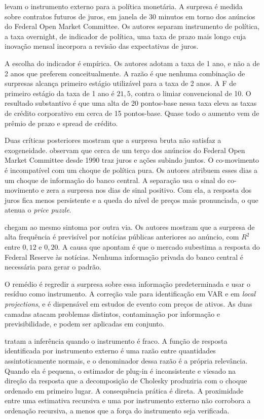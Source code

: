 \documentclass[
article,			%
12pt,				%
oneside,			%
a4paper,			%
hidelinks, 
english,			%
brazil,				%
]{abntex2}
\theoremstyle{plain}
\theoremstyle{definition}
\theoremstyle{remark}
\begin{document}
 levam o instrumento externo para a política monetária. A surpresa é medida sobre contratos futuros de juros, em janela de 30 minutos em torno dos anúncios do Federal Open Market Committee. Os autores separam instrumento de política, a taxa overnight, de indicador de política, uma taxa de prazo mais longo cuja inovação mensal incorpora a revisão das expectativas de juros.

A escolha do indicador é empírica. Os autores adotam a taxa de 1 ano, e não a de 2 anos que preferem conceitualmente. A razão é que nenhuma combinação de surpresas alcança primeiro estágio utilizável para a taxa de 2 anos. A F de primeiro estágio da taxa de 1 ano é $21{,}5$, contra o limiar convencional de 10. O resultado substantivo é que uma alta de 20 pontos-base nessa taxa eleva as taxas de crédito corporativo em cerca de 15 pontos-base. Quase todo o aumento vem de prêmio de prazo e spread de crédito.

Duas críticas posteriores mostram que a surpresa bruta não satisfaz a exogeneidade.  observam que cerca de um terço dos anúncios do Federal Open Market Committee desde 1990 traz juros e ações subindo juntos. O co-movimento é incompatível com um choque de política pura. Os autores atribuem esses dias a um choque de informação do banco central. A separação usa o sinal do co-movimento e zera a surpresa nos dias de sinal positivo. Com ela, a resposta dos juros fica menos persistente e a queda do nível de preços mais pronunciada, o que atenua o \textit{price puzzle}.

 chegam ao mesmo sintoma por outra via. Os autores mostram que a surpresa de alta frequência é previsível por notícias públicas anteriores ao anúncio, com $R^2$ entre $0{,}12$ e $0{,}20$. A causa que apontam é que o mercado subestima a resposta do Federal Reserve às notícias. Nenhuma informação privada do banco central é necessária para gerar o padrão.

O remédio é regredir a surpresa sobre essa informação predeterminada e usar o resíduo como instrumento. A correção vale para identificação em VAR e em \textit{local projections}, e é dispensável em estudos de evento com preços de ativos. As duas camadas atacam problemas distintos, contaminação por informação e previsibilidade, e podem ser aplicadas em conjunto.

 tratam a inferência quando o instrumento é fraco. A função de resposta identificada por instrumento externo é uma razão entre quantidades assintoticamente normais, e o denominador dessa razão é a própria relevância. Quando ela é pequena, o estimador de plug-in é inconsistente e viesado na direção da resposta que a decomposição de Cholesky produziria com o choque ordenado em primeiro lugar. A consequência prática é direta. A proximidade entre uma estimativa recursiva e uma por instrumento externo não corrobora a ordenação recursiva, a menos que a força do instrumento seja verificada.
\end{document}

